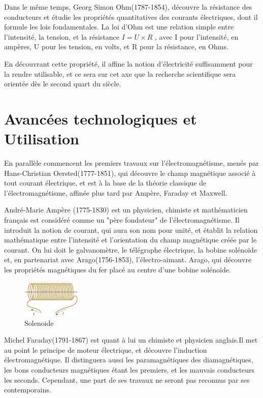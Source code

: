 \documentclass[12pt]{report}
\begin{document}
Dans le même temps, Georg Simon Ohm(1787-1854), découvre la résistance des conducteurs et étudie les propriétés quantitatives des courants électriques, dont il formule les lois fondamentales. La loi d'Ohm est une relation simple entre l'intensité, la tension, et la résistance \( I = U \times R \) , avec I pour l'intensité, en ampères, U pour les tension, en volts, et R pour la résistance, en Ohms.
    
    En découvrant cette propriété, il affine la notion d'électricité suffisamment pour la rendre utilisable, et ce sera sur cet axe que la recherche scientifique sera orientée dès le second quart du siècle.
\section{Avancées technologiques et Utilisation}
En parallèle commencent les premiers travaux sur l'électromagnétisme, menés par Hans-Christian Oersted(1777-1851), qui découvre le champ magnétique associé à tout courant électrique, et est à la base de la théorie classique de l'électromagnétisme, affinée plus tard par Ampère, Faraday et Maxwell.


André-Marie Ampère (1775-1830) est un physicien, chimiste et mathématicien français est considéré comme un "père fondateur" de l'électromagnétisme. Il introduit la notion de courant, qui aura son nom pour unité, et établit la relation mathématique entre l'intensité et l'orientation du champ magnétique créée par le courant. On lui doit le galvanomètre, le télégraphe électrique, la bobine solénoïde et, en partenariat avec Arago(1756-1853), l'électro-aimant.
Arago, qui découvre les propriétés magnétiques du fer placé au centre d'une bobine solénoïde.

\begin{figure}
  \begin{center}
    \includegraphics[width=0.25\textwidth]{solenoide}
  \end{center}
  \caption{Solenoide}
\end{figure}
Michel Faraday(1791-1867) est quant à lui un chimiste et physicien anglais.Il met au point le principe de moteur électrique, et découvre l'induction électromagnétique. Il distinguera aussi les paramagnétiques des diamagnétiques, les bons conducteurs magnétiques étant les premiers, et les mauvais conducteurs les seconds.
Cependant, une part de ses travaux ne seront pas reconnus par ses contemporains.
\end{document}
